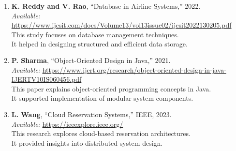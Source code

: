 \documentclass[a4paper,timesnewroman,12pt,twoside]{report}
\numberwithin{equation}{section}
\begin{document}
\begin{enumerate}
\item \textbf{K. Reddy and V. Rao}, “Database in Airline Systems,” 2022.\\
\textit{Available:} \url{https://www.ijcsit.com/docs/Volume13/vol13issue02/ijcsit2022130205.pdf}\\
\hspace*{1em}This study focuses on database management techniques.\\
\hspace*{1em}It helped in designing structured and efficient data storage.

\item \textbf{P. Sharma}, “Object-Oriented Design in Java,” 2021.\\
\textit{Available:} \url{https://www.ijert.org/research/object-oriented-design-in-java-IJERTV10IS060456.pdf}\\
\hspace*{1em}This paper explains object-oriented programming concepts in Java.\\
\hspace*{1em}It supported implementation of modular system components.

\item \textbf{L. Wang}, “Cloud Reservation Systems,” IEEE, 2023.\\
\textit{Available:} \url{https://ieeexplore.ieee.org/}\\
\hspace*{1em}This research explores cloud-based reservation architectures.\\
\hspace*{1em}It provided insights into distributed system design.



\end{enumerate}
\end{document}
